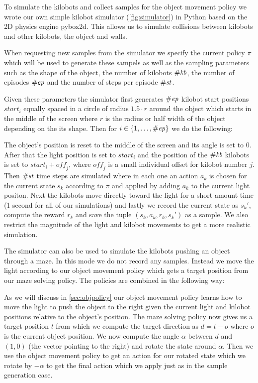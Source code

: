 \documentclass[twoside]{article}
\begin{document}
To simulate the kilobots and collect samples for the object movement policy we
wrote our own simple kilobot simulator (\autoref{fig:simulator}) in Python based
on the 2D physics engine pybox2d\cite{pybox2d}. This allows us to simulate
collisions between kilobots and other kilobots, the object and walls.

When requesting new samples from the simulator we specify the current policy
$\pi$ which will be used to generate these sampels as well as the sampling
parameters such as the shape of the object, the number of kilobots $\#\mathit{kb}$, the
number of episodes $\#\mathit{ep}$ and the number of steps per episode $\#\mathit{st}$.

Given these parameters the simulator first generates $\#\mathit{ep}$ kilobot start
positions $\mathit{start}_i$ equally spaced in a circle of radius $1.5 \cdot r$
around the object which starts in the middle of the screen where $r$ is the
radius or half width of the object depending on the its shape. Then for
$i \in \{1, \dots, \#\mathit{ep}\}$ we do the following:

The object's position is reset to the middle of the screen and its angle is set
to 0. After that the light position is set to $\mathit{start}_i$ and the
position of the $\#\mathit{kb}$ kilobots is set to $\mathit{start}_i + \mathit{off}_j$,
where $\mathit{off}_j$ is a small individual offset for kilobot number $j$.
Then $\#\mathit{st}$ time steps are simulated where in each one an action $a_k$ is chosen
for the current state $s_k$ according to $\pi$ and applied by adding $a_k$ to
the current light positon. Next the kilobots move directly toward the light for
a short amount time (1 second for all of our simulations) and lastly we record
the current state as $s_k'$, compute the reward $r_k$ and save the tuple $(s_k,
a_k, r_k, s_k')$ as a sample. We also restrict the magnitude of the light and
kilobot movements to get a more realistic simulation.

The simulator can also be used to simulate the kilobots pushing an object
through a maze. In this mode we do not record any samples. Instead we move the
light according to our object movement policy which gets a target position from
our maze solving policy. The policies are combined in the following way:

As we will discuss in \ref{sec:objpolicy} our object movement policy learns
how to move the light to push the object to the right given the current light
and kilobot positions relative to the object's position. The maze solving policy
now gives us a target position $t$ from which we compute the target direction as
$d = t - o$ where $o$ is the current object position. We now compute the angle
$\alpha$ between $d$ and $(1, 0)$ (the vector pointing to the right) and rotate
the state around $\alpha$. Then we use the object movement policy to get an
action for our rotated state which we rotate by $-\alpha$ to get the final
action which we apply just as in the sample generation case.
\end{document}
